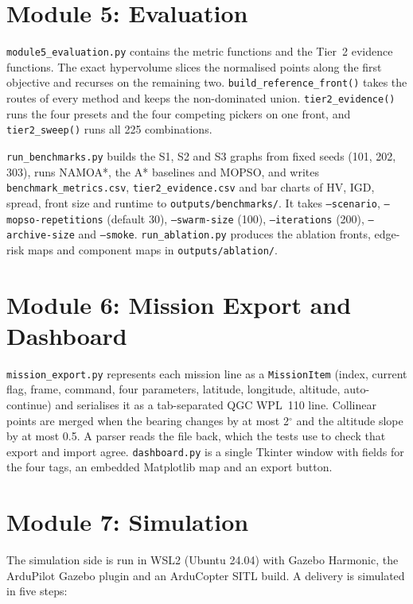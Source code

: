 \documentclass{ssnreview}
\begin{document}
\section{Module 5: Evaluation}

\texttt{module5\_evaluation.py} contains the metric functions and the Tier~2 evidence
functions. The exact hypervolume slices the normalised points along the first objective
and recurses on the remaining two. \texttt{build\_reference\_front()} takes the routes of
every method and keeps the non-dominated union. \texttt{tier2\_evidence()} runs the four
presets and the four competing pickers on one front, and \texttt{tier2\_sweep()} runs all
225 combinations.

\texttt{run\_benchmarks.py} builds the S1, S2 and S3 graphs from fixed seeds (101, 202,
303), runs NAMOA*, the A* baselines and MOPSO, and writes \texttt{benchmark\_metrics.csv},
\texttt{tier2\_evidence.csv} and bar charts of HV, IGD, spread, front size and runtime to
\texttt{outputs/benchmarks/}. It takes \texttt{--scenario}, \texttt{--mopso-repetitions}
(default 30), \texttt{--swarm-size} (100), \texttt{--iterations} (200),
\texttt{--archive-size} and \texttt{--smoke}. \texttt{run\_ablation.py} produces the
ablation fronts, edge-risk maps and component maps in \texttt{outputs/ablation/}.

\section{Module 6: Mission Export and Dashboard}

\texttt{mission\_export.py} represents each mission line as a \texttt{MissionItem}
(index, current flag, frame, command, four parameters, latitude, longitude, altitude,
auto-continue) and serialises it as a tab-separated QGC WPL~110 line. Collinear points are
merged when the bearing changes by at most 2$^\circ$ and the altitude slope by at most
0.5. A parser reads the file back, which the tests use to check that export and import
agree. \texttt{dashboard.py} is a single Tkinter window with fields for the four tags, an
embedded Matplotlib map and an export button.

\section{Module 7: Simulation}

The simulation side is run in WSL2 (Ubuntu 24.04) with Gazebo Harmonic, the ArduPilot
Gazebo plugin and an ArduCopter SITL build. A delivery is simulated in five steps:
\end{document}
